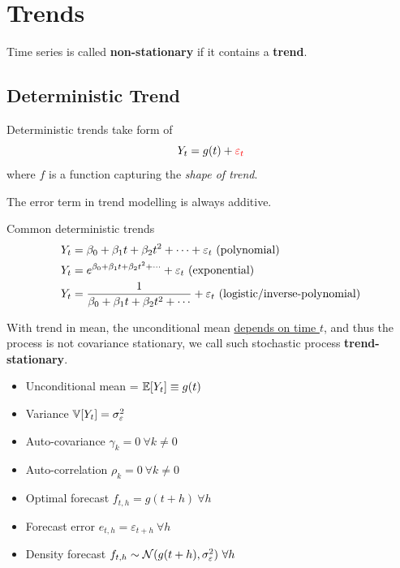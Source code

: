 \documentclass[11pt]{article}
\begin{document}
	\section{Trends}
		\begin{definition}
			 Time series is called \textbf{non-stationary} if it contains a \textbf{trend}.
		\end{definition}
		
		\subsection{Deterministic Trend}
		    \begin{definition}
		        Deterministic trends take form of
		        \begin{equation}
		            Y_t = g(t) + \textcolor{red}{\varepsilon_{t}}
		        \end{equation}
		        where $f$ is a function capturing the \emph{shape of trend}.
		    \end{definition}
		    
		    \begin{remark}
		        The error term in trend modelling is always additive.
		    \end{remark}
		    
		    \begin{example}
		        Common deterministic trends
		        \begin{align}
		            Y_t &= \beta_0 + \beta_1 t + \beta_2 t^2 + \cdots + \varepsilon_t \text{{ (polynomial)}}\\
		            Y_t &= e^{\beta_0 + \beta_1 t + \beta_2 t^2 + \cdots} + \varepsilon_t \text{{ (exponential)}} \\
		            Y_t &= \frac{1}{\beta_0 + \beta_1 t + \beta_2 t^2 + \cdots} + \varepsilon_t \text{{ (logistic/inverse-polynomial)}}
		        \end{align}
		    \end{example}

    		\begin{remark}
    		    With trend in mean, the unconditional mean \ul{depends on time $t$}, and thus the process is not covariance stationary, we call such stochastic process \textbf{trend-stationary}.
    		\end{remark}
		    
		    \begin{itemize}
		        \item Unconditional mean = $\mathbb{E}[{Y_t}] \equiv g(t)$
		        \item Variance $\mathbb{V}[{Y_t}] = \sigma_\varepsilon^2$
		        \item Auto-covariance $\gamma_k = 0\ \forall k \neq 0$
		        \item Auto-correlation $\rho_k = 0\ \forall k \neq 0$
		        \item Optimal forecast $f_{t, h} = g(t+h)\ \forall h$
		        \item Forecast error $e_{t, h} = \varepsilon_{t+h}\ \forall h$
		        \item Density forecast $f_{t,h} \sim \mathcal{{N}}(g(t+h), \sigma_\varepsilon^2)\ \forall h$
		    \end{itemize}
    		
\end{document}
